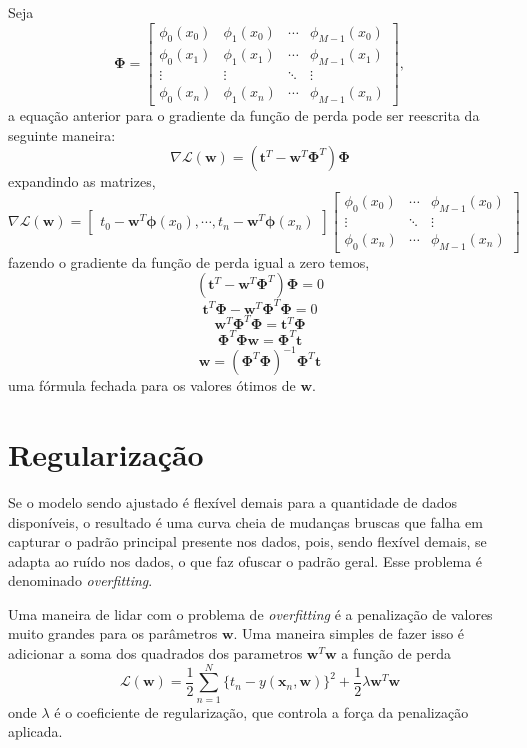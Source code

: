 \documentclass{article}
\begin{document}
Seja
\[ \boldsymbol{\Phi} = \begin{bmatrix}
        \phi_0(x_0) & \phi_1(x_0) & \dotsb & \phi_{M-1}(x_0) \\
        \phi_0(x_1) & \phi_1(x_1) & \dotsb & \phi_{M-1}(x_1) \\
        \vdots & \vdots & \ddots & \vdots \\
        \phi_0(x_n) & \phi_1(x_n) & \dotsb & \phi_{M-1}(x_n)
    \end{bmatrix},
\]
a equação anterior para o gradiente da função de perda pode ser reescrita da seguinte maneira:
\[
    \nabla \mathcal{L}(\textbf{w}) = (\textbf{t}^T - \textbf{w}^T \boldsymbol{\Phi}^T) \boldsymbol{\Phi}
\]
expandindo as matrizes,
\[
    \nabla \mathcal{L}(\textbf{w}) =
    \begin{bmatrix} t_0 - \textbf{w}^T \boldsymbol{\phi}(x_0), \dotsb, t_n - \textbf{w}^T \boldsymbol{\phi}(x_n)\end{bmatrix}
    \begin{bmatrix}
        \phi_0(x_0) & \dotsb & \phi_{M-1}(x_0) \\
        \vdots & \ddots & \vdots \\
        \phi_0(x_n) & \dotsb & \phi_{M-1}(x_n)
\end{bmatrix}
\]
fazendo o gradiente da função de perda igual a zero temos,
\[
    (\textbf{t}^T - \textbf{w}^T \boldsymbol{\Phi}^T) \boldsymbol{\Phi} = 0
\]
\[
    \textbf{t}^T \boldsymbol{\Phi} - \textbf{w}^T \boldsymbol{\Phi}^T \boldsymbol{\Phi} = 0
\]
\[
    \textbf{w}^T \boldsymbol{\Phi}^T \boldsymbol{\Phi} = \textbf{t}^T \boldsymbol{\Phi}
\]
\[
    \boldsymbol{\Phi}^T \boldsymbol{\Phi} \textbf{w} = \boldsymbol{\Phi}^T \textbf{t}
\]
\[
    \textbf{w} = (\boldsymbol{\Phi}^T \boldsymbol{\Phi})^{-1} \boldsymbol{\Phi}^T \textbf{t}
\]
uma fórmula fechada para os valores ótimos de \( \textbf{w} \).

\section{Regularização}

Se o modelo sendo ajustado é flexível demais para a quantidade de dados disponíveis, o resultado
é uma curva cheia de mudanças bruscas que falha em capturar o padrão principal presente nos dados, pois,
sendo flexível demais, se adapta ao ruído nos dados, o que faz ofuscar o padrão geral. Esse problema é
denominado \emph{overfitting}.

Uma maneira de lidar com o problema de \emph{overfitting} é a penalização de valores muito grandes para
os parâmetros \( \textbf{w} \). Uma maneira simples de fazer isso é adicionar a soma dos quadrados dos
parametros \( \textbf{w}^T \textbf{w} \) a função de perda
\[ \mathcal{L}(\textbf{w}) = \frac{1}{2} \sum_{n=1}^{N} \{ t_n - y(\textbf{x}_n, \textbf{w})\}^2 + \frac{1}{2} \lambda \textbf{w}^T \textbf{w} \]
onde \( \lambda \) é o coeficiente de regularização, que controla a força da penalização aplicada.
\end{document}
